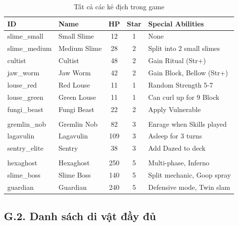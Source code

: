 \begin{table}[H]
    \centering
    \caption{Tất cả các kẻ địch trong game}
    \label{tab:all_enemies}
    \begin{tabular}{l l c c p{5cm}}
        \toprule
        \textbf{ID} & \textbf{Name} & \textbf{HP} & \textbf{Star} & \textbf{Special Abilities} \\
        \midrule
        slime\_small & Small Slime & 12 & 1 & None \\
        slime\_medium & Medium Slime & 28 & 2 & Split into 2 small slimes \\
        cultist & Cultist & 48 & 2 & Gain Ritual (Str+) \\
        jaw\_worm & Jaw Worm & 42 & 2 & Gain Block, Bellow (Str+) \\
        louse\_red & Red Louse & 11 & 1 & Random Strength 5-7 \\
        louse\_green & Green Louse & 11 & 1 & Can curl up for 9 Block \\
        fungi\_beast & Fungi Beast & 22 & 2 & Apply Vulnerable \\
        \addlinespace
        \multicolumn{5}{c}{\textit{Elite Enemies}} \\
        \midrule
        gremlin\_nob & Gremlin Nob & 82 & 3 & Enrage when Skills played \\
        lagavulin & Lagavulin & 109 & 3 & Asleep for 3 turns \\
        sentry\_elite & Sentry & 38 & 3 & Add Dazed to deck \\
        \addlinespace
        \multicolumn{5}{c}{\textit{Boss}} \\
        \midrule
        hexaghost & Hexaghost & 250 & 5 & Multi-phase, Inferno \\
        slime\_boss & Slime Boss & 140 & 5 & Split mechanic, Goop spray\\
        guardian & Guardian & 240 & 5 & Defensive mode, Twin slam \\
        \bottomrule
    \end{tabular}
\end{table}

\subsection*{G.2. Danh sách di vật đầy đủ}

